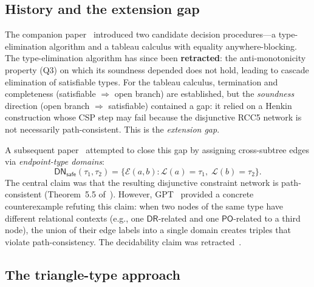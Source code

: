 \documentclass[a4paper,11pt]{article}
\theoremstyle{definition}
\newcommand{\DR}{\ensuremath{\mathsf{DR}}}
\newcommand{\PO}{\ensuremath{\mathsf{PO}}}
\newcommand{\DN}{\ensuremath{\mathsf{DN}}}
\begin{document}
\subsection{History and the extension gap}

The companion paper~\cite{CompanionPaper} introduced two candidate
decision procedures---a type-elimination algorithm and a tableau
calculus with equality anywhere-blocking.  The type-elimination
algorithm has since been \textbf{retracted}: the anti-monotonicity
property (Q3) on which its soundness depended does not hold, leading
to cascade elimination of satisfiable types.  For the tableau
calculus, termination and completeness (satisfiable $\Rightarrow$
open branch) are established, but the \emph{soundness} direction
(open branch $\Rightarrow$ satisfiable) contained a gap: it relied
on a Henkin construction whose CSP step may fail because the
disjunctive RCC5 network is not necessarily path-consistent.  This
is the \emph{extension gap}.

A subsequent paper~\cite{ExtensionGapPaper} attempted to close this
gap by assigning cross-subtree edges via \emph{endpoint-type domains}:
\[
  \DN_{\mathsf{safe}}(\tau_1, \tau_2) = \bigl\{
    \mathcal{E}(a, b) : \mathcal{L}(a) = \tau_1,\;
    \mathcal{L}(b) = \tau_2
  \bigr\}.
\]
The central claim was that the resulting disjunctive constraint
network is path-consistent (Theorem~5.5 of~\cite{ExtensionGapPaper}).
However, GPT~\cite{GPTReview} provided a concrete counterexample
refuting this claim: when two nodes of the same type have different
relational contexts (e.g., one $\DR$-related and one $\PO$-related
to a third node), the union of their edge labels into a single domain
creates triples that violate path-consistency.  The decidability
claim was retracted~\cite{Response}.

\subsection{The triangle-type approach}
\end{document}

